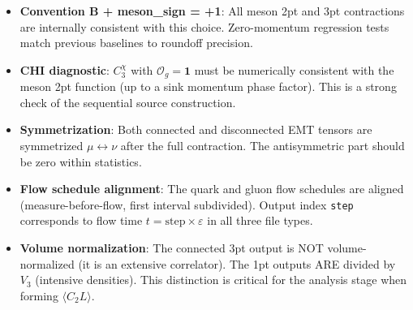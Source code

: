 \documentclass[11pt,a4paper]{article}
\newcommand{\code}[1]{\texttt{#1}}
\begin{document}
\begin{itemize}
  \item \textbf{Convention B + meson\_sign = +1}: All meson 2pt and 3pt contractions are internally consistent with this choice. Zero-momentum regression tests match previous baselines to roundoff precision.
  \item \textbf{CHI diagnostic}: $C_3^\chi$ with $\mathcal{O}_g = \mathbf{1}$ must be numerically consistent with the meson 2pt function (up to a sink momentum phase factor). This is a strong check of the sequential source construction.
  \item \textbf{Symmetrization}: Both connected and disconnected EMT tensors are symmetrized $\mu \leftrightarrow \nu$ after the full contraction. The antisymmetric part should be zero within statistics.
  \item \textbf{Flow schedule alignment}: The quark and gluon flow schedules are aligned (measure-before-flow, first interval subdivided). Output index \code{step} corresponds to flow time $t = \text{step} \times \varepsilon$ in all three file types.
  \item \textbf{Volume normalization}: The connected 3pt output is NOT volume-normalized (it is an extensive correlator). The 1pt outputs ARE divided by $V_3$ (intensive densities). This distinction is critical for the analysis stage when forming $\langle C_2 L \rangle$.
\end{itemize}
\end{document}
